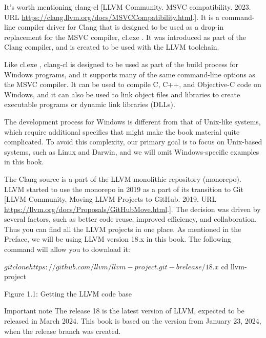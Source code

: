It’s worth mentioning clang-cl [LLVM Community. MSVC compatibility. 2023. URL \url{https://clang.llvm.org/docs/MSVCCompatibility.html}.]. It is a command-line compiler driver for Clang that is designed to be used as a drop-in replacement for the MSVC compiler, cl.exe . It was introduced as part of the Clang compiler, and is created to be used with the LLVM toolchain.

Like cl.exe , clang-cl is designed to be used as part of the build process for Windows programs, and it supports many of the same command-line options as the MSVC compiler. It can be used to compile C, C++, and Objective-C code on Windows, and it can also be used to link object files and libraries to create executable programs or dynamic link libraries (DLLs).

The development process for Windows is different from that of Unix-like systems, which require additional specifics that might make the book material quite complicated. To avoid this complexity, our primary goal is to focus on Unix-based systems, such as Linux and Darwin, and we will omit Windows-specific examples in this book.




The Clang source is a part of the LLVM monolithic repository (monorepo). LLVM started to use the monorepo in 2019 as a part of its transition to Git [LLVM Community. Moving LLVM Projects to GitHub. 2019. URL \url{https://llvm.org/docs/Proposals/GitHubMove.html}.]. The decision was driven by several factors, such as better code reuse, improved efficiency, and collaboration. Thus you can find all the LLVM projects in one place. As mentioned in the Preface, we will be using LLVM version 18.x in this book. The following command will allow you to download it:

\begin{shell}
$ git clone https://github.com/llvm/llvm-project.git -b release/18.x
$ cd llvm-project
\end{shell}

\begin{center}
Figure 1.1: Getting the LLVM code base
\end{center}


\begin{myNotic}{Important note}
The release 18 is the latest version of LLVM, expected to be released in March 2024. This book is based on the version from January 23, 2024, when the release branch was created.
\end{myNotic}


